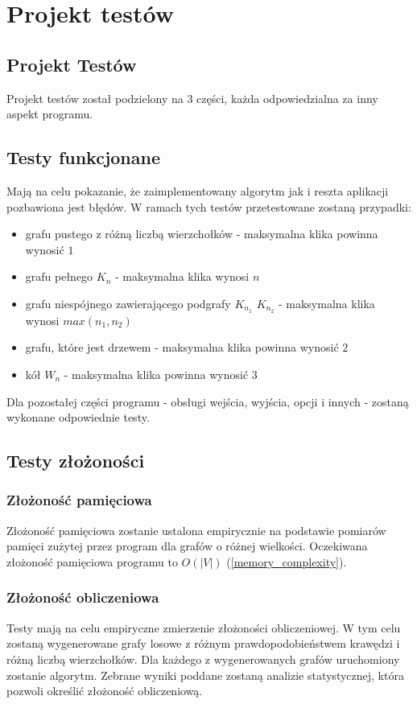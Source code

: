 \documentclass[12pt, a4paper]{article}
\begin{document}
\section{Projekt testów}
\label{sec-4}

\subsection{Projekt Testów}
Projekt testów został podzielony na 3 części, każda odpowiedzialna za inny aspekt programu.

\subsection{Testy funkcjonane}
Mają na celu pokazanie, że zaimplementowany algorytm jak i reszta aplikacji pozbawiona jest błędów. W ramach tych testów przetestowane zostaną przypadki:

\begin{itemize}
\item grafu pustego z różną liczbą wierzchołków - maksymalna klika powinna wynosić $1$
\item grafu pełnego $K_{n}$ - maksymalna klika wynosi $n$
\item grafu niespójnego zawierającego podgrafy $K_{n_{1}}$ $K_{n_{2}}$ - maksymalna klika wynosi $max(n_{1}, n_{2})$
\item grafu, które jest drzewem - maksymalna klika powinna wynosić $2$
\item kół $W_{n}$ - maksymalna klika powinna wynosić $3$
\end{itemize}

Dla pozostałej części programu - obsługi wejścia, wyjścia, opcji i innych - zostaną wykonane odpowiednie testy.

\subsection{Testy złożoności}
\subsubsection{Złożoność pamięciowa}
Złożoność pamięciowa zostanie ustalona empirycznie na podstawie pomiarów pamięci zużytej przez program dla grafów o różnej wielkości. Oczekiwana złożoność pamięciowa programu to $O(|V|)$ (\ref{memory_complexity}). 

\subsubsection{Złożoność obliczeniowa}
Testy mają na celu empiryczne zmierzenie złożoności obliczeniowej. W tym celu zostaną wygenerowane grafy losowe z różnym prawdopodobieństwem krawędzi i różną liczbą wierzchołków. Dla każdego z wygenerowanych grafów uruchomiony zostanie algorytm. Zebrane wyniki poddane zostaną analizie statystycznej, która pozwoli określić złożoność obliczeniową.
\end{document}
